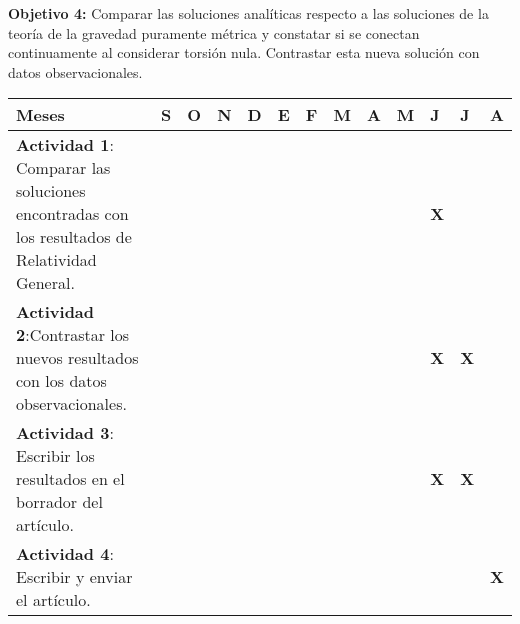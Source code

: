\textbf{ Objetivo 4:} Comparar las soluciones analíticas respecto a las soluciones de la teoría de la gravedad puramente métrica y constatar si se conectan continuamente al considerar torsión nula. Contrastar esta nueva solución con datos observacionales.
\begin{center}
\begin{tabular}{|p{7cm} | p{0.2cm}|p{0.2cm}| p{0.2cm}| p{0.2cm}| p{0.2cm}| p{0.2cm}|p{0.2cm}| p{0.2cm}| p{0.2cm}|p{0.2cm}|p{0.2cm}|p{0.2cm}|} 
 \hline
 \textbf{Meses}&\textbf{S}&\textbf{O}&\textbf{N}&\textbf{D}&\textbf{E}&\textbf{F}&\textbf{M}&\textbf{A}&\textbf{M}&\textbf{J}&\textbf{J}&\textbf{A}\\ \hline
 \textbf{Actividad 1}: Comparar las soluciones encontradas con los resultados de Relatividad General.&&&&&&&&&&\textbf{X}&&\\ \hline
 \textbf{Actividad 2}:Contrastar los nuevos resultados con los datos observacionales.&&&&&&&&&&\textbf{X}&\textbf{X}&\\ \hline
\textbf{ Actividad 3}: Escribir los resultados en el borrador del artículo.&&&&&&&&&&\textbf{X}&\textbf{X}&\\ \hline
\textbf{ Actividad 4}: Escribir y enviar el artículo.&&&&&&&&&&&&\textbf{X}\\ \hline
\end{tabular}
\end{center}













